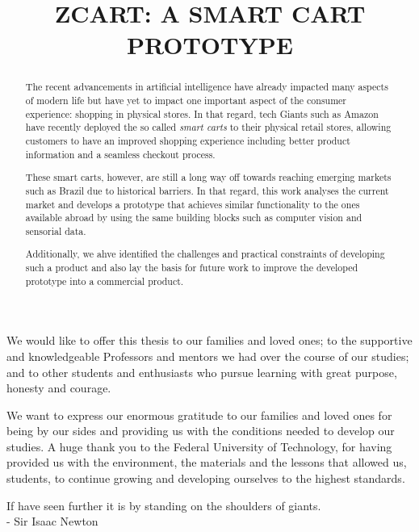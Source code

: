 \documentclass[openright]{normas-utf-tex} %
\title{\MakeUppercase{zCart: A smart cart prototype}} %
\begin{document}
\capa %
\folhaderosto %

\begin{dedicatoria}
We would like to offer this thesis to our families and loved ones;
to the supportive and knowledgeable Professors and mentors we had
over the course of our studies; and to other students and enthusiasts
who pursue learning with great purpose, honesty and courage.
\end{dedicatoria}

\begin{agradecimentos}
We want to express our enormous gratitude to our families and loved ones 
for being by our sides and providing us with the conditions needed to develop our studies.
A huge thank you to the Federal University of Technology, for having
provided us with the environment, the materials and the lessons	that allowed us,
students, to continue growing and developing ourselves to the highest standards.
\end{agradecimentos}

\begin{epigrafe}
 If have seen further it is by standing on the shoulders of giants.  \\
- Sir Isaac Newton
\end{epigrafe}

\begin{abstract}
The recent advancements in artificial intelligence have already impacted many
aspects of modern life but have yet to impact one important aspect of the
consumer experience: shopping in physical stores. In that regard, tech
Giants such as Amazon have recently deployed the so called \textit{smart
carts} to their physical retail stores, allowing customers to have an
improved shopping experience including better product information and a
seamless checkout process.

These  smart carts, however, are still a long way off towards reaching emerging
markets such as Brazil due to historical barriers. In that regard, 
this work analyses the current market and develops a prototype that
achieves similar functionality to the ones available abroad by using the same
building blocks such as computer vision and sensorial data.

Additionally, we ahve identified the challenges and practical constraints of
developing such a product and also lay the basis for future work to improve
the developed prototype into a commercial product.
\end{abstract}
\end{document}
